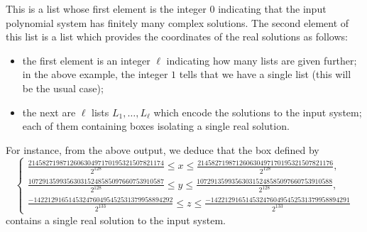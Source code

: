 \documentclass[a4paper,english,11pt]{scrartcl}
\theoremstyle{definition}
\theoremstyle{remark}
\def\leq{\leqslant}
\begin{document}
This is a list whose first element is the integer $0$ indicating that the input
polynomial system has finitely many complex solutions. The second element of
this list is a list which provides the coordinates of the real solutions as
follows:
\begin{itemize}
\item the first element is an integer $\ell$ indicating how many lists are given
  further; in the above example, the integer $1$ tells that we have a single
  list (this will be the usual case);
\item the next are $\ell$ lists $L_1, \ldots, L_\ell$ which encode the solutions
  to the input system; each of them containing boxes isolating a single real
  solution. 
\end{itemize}
For instance, from the above output, we deduce that the box defined by 
\[
  \left \{
    \begin{array}{l}
      \frac{214582719871260630497170195321507821174}{2^{128}}
      \leq x \leq
      \frac{214582719871260630497170195321507821176}{2^{128}}, \\
      \frac{107291359935630315248585097660753910587}{2^{128}}
      \leq y \leq
      \frac{107291359935630315248585097660753910588}{2^{128}}, \\
      \frac{-1422129165145324760495452531379958894292}{2^{133}}
      \leq z \leq
      \frac{-1422129165145324760495452531379958894291}{2^{133}}
\end{array}\right .
\]
contains a single real solution to the input system.
\end{document}
